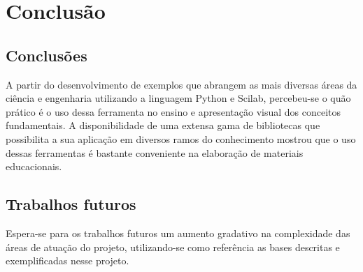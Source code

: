 \chapter{Conclusão}

\section{Conclusões}
A partir do desenvolvimento de exemplos que abrangem as mais diversas áreas da ciência e engenharia utilizando a linguagem Python e Scilab, percebeu-se o quão prático é o uso dessa ferramenta no ensino e apresentação visual dos conceitos fundamentais. A disponibilidade de uma extensa gama de bibliotecas que possibilita a sua aplicação em diversos ramos do conhecimento mostrou que o uso dessas ferramentas é bastante conveniente na elaboração de materiais educacionais. 

\section{Trabalhos futuros}
Espera-se para os trabalhos futuros um aumento gradativo na complexidade das áreas de atuação do projeto, utilizando-se como referência as bases descritas e exemplificadas nesse projeto.